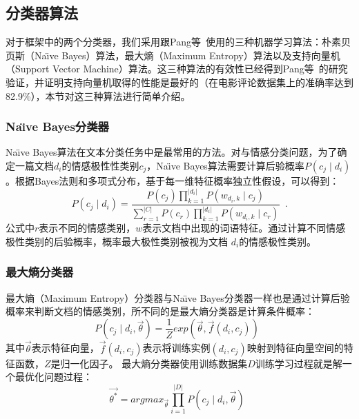 \subsection{分类器算法}
\label{classifier}
对于框架中的两个分类器，我们采用跟Pang等~使用的三种机器学习算法：朴素贝页斯（Na\"\i ve Bayes）算法，最大熵（Maximum Entropy）算法以及支持向量机（Support Vector Machine）算法。这三种算法的有效性已经得到Pang等~的研究验证，并证明支持向量机取得的性能是最好的（在电影评论数据集上的准确率达到82.9\%），本节对这三种算法进行简单介绍。

\subsubsection{Na\"\i ve Bayes分类器}
\label{bayes}
Na\"\i ve Bayes算法在文本分类任务中是最常用的方法。对与情感分类问题，为了确定一篇文档$ d_{i}$的情感极性性类别$ c_{j} $，Na\"\i ve Bayes算法需要计算后验概率$ P \left(c_{j} \mid d_{i} \right)$。根据Bayes法则和多项式分布，基于每一维特征概率独立性假设，可以得到：
\begin{equation}
\label{e4}
P \left(c_{j} \mid d_{i} \right) = \frac{P \left( c_{j} \right)\prod_{k=1}^{| d_{i} |} P \left( w_{d_{i},k} \mid c_{j} \right)}{\sum_{r=1}^{|C|}P \left( c_{r} \right)\prod_{k=1}^{| d_{i} |} P \left( w_{d_{i},k} \mid c_{r} \right)} \enspace .
\end{equation}
公式中$ r $表示不同的情感类别，$ w $表示文档中出现的词语特征。通过计算不同情感极性类别的后验概率，概率最大极性类别被视为文档 $ d_{i} $的情感极性类别。

\subsubsection{最大熵分类器}
\label{entropy}
最大熵（Maximum Entropy）分类器与Na\"\i ve Bayes分类器一样也是通过计算后验概率来判断文档的情感类别，所不同的是最大熵分类器是计算条件概率：
\begin{equation}
\label{e5}
P \left( c_{j} \mid d_{i}, \overrightarrow{\theta} \right) = \frac{1}{Z}exp \left( \overrightarrow{\theta}, \overrightarrow{f} \left( d_{i},c_{j} \right) \right) \enspace
\end{equation}
其中$ \overrightarrow{\theta} $表示特征向量，$ \overrightarrow{f} \left( d_{i}, c_{j} \right)$表示将训练实例$ \left( d_{i}, c_{j} \right) $映射到特征向量空间的特征函数，$ Z $是归一化因子。
最大熵分类器使用训练数据集$ D $训练学习过程就是解一个最优化问题过程：
\begin{equation}
\label{e6}
\overrightarrow{\theta^{\ast}}=argmax_{\overrightarrow{\theta}}\prod_{i=1}^{|D|} P \left( c_{j} \mid d_{i}, \overrightarrow{\theta} \right) \enspace
\end{equation} 

